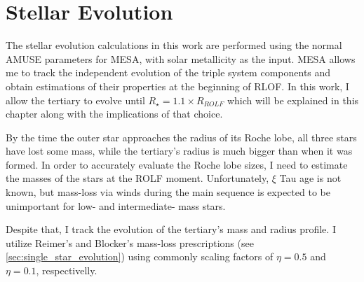 \section{Stellar Evolution}\label{sec:stellar_evolution}

The stellar evolution calculations in this work are performed using the normal AMUSE parameters for MESA, with solar metallicity as the input.
MESA allows me to track the independent evolution of the triple system components and obtain estimations of their properties at the beginning of RLOF. In this work, I allow the tertiary to evolve until $R_{\star} = 1.1 \times R_{ROLF}$ which will be explained in this chapter along with the implications of that choice.

By the time the outer star approaches the radius of its Roche lobe, all three stars have lost some mass, while the tertiary's radius is much bigger than when it was formed. In order to accurately evaluate the Roche lobe sizes,  I need to estimate the masses of the stars at the ROLF moment. Unfortunately, $\xi$ Tau age is not known, but mass-loss via winds during the main sequence is expected to be unimportant for low- and intermediate- mass stars.

Despite that, I track the evolution of the tertiary's mass and radius profile. I utilize Reimer's \cite{reimers1975circumstellar} and Blocker's \cite{bloecker1995stellarI,bloecker1995stellarII} mass-loss prescriptions (see \cref{sec:single_star_evolution}) using commonly scaling factors of $\eta = 0.5$ and $\eta = 0.1$, respectivelly.

